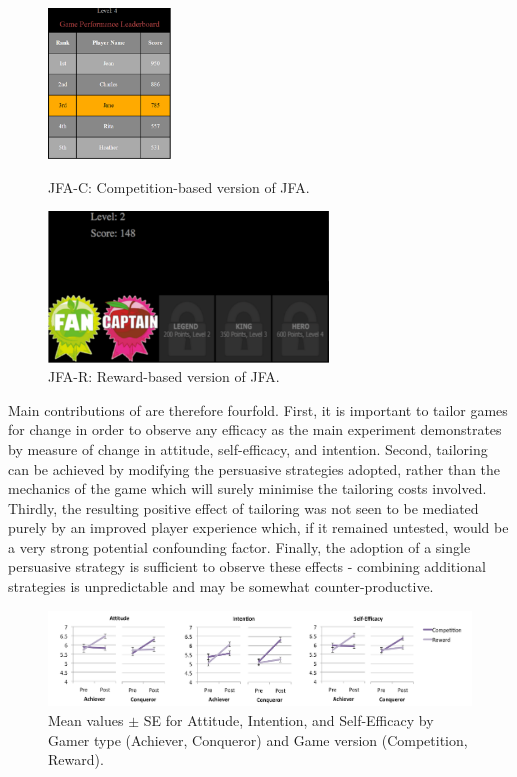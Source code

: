\documentclass[11pt]{article}
\begin{document}
\begin{figure}[H]
\centering
  \includegraphics[height=4cm]{img/orji2017-junk-food-aliens-competition.png}
  \caption{JFA-C: Competition-based version of JFA.}\label{fig:orji2017-junk-food-aliens-competition}
\endminipage\hfill
{}%
\centering
  \includegraphics[height=4cm]{img/orji2017-junk-food-aliens-reward.png}
  \caption{JFA-R: Reward-based version of JFA.}\label{fig:orji2017-junk-food-aliens-reward}
\endminipage
\end{figure}

Main contributions of \citet{orji2017} are therefore fourfold. First, it is important to tailor games for change in order to observe any efficacy as the main experiment demonstrates by measure of change in attitude, self-efficacy, and intention. Second, tailoring can be achieved by modifying the persuasive strategies adopted, rather than the mechanics of the game which will surely minimise the tailoring costs involved. 
Thirdly, the resulting positive effect of tailoring was not seen to be mediated purely by an improved player experience which, if it remained untested, would be a very strong potential confounding factor. Finally, the adoption of a single persuasive strategy is sufficient to observe these effects - combining additional strategies is unpredictable and may be somewhat counter-productive.


\begin{figure}[H]
\centering
\includegraphics[width=\textwidth]{img/orji2017-tailoring-results.png} 
\caption{Mean values $\pm$ SE for Attitude, Intention, and Self-Efficacy by Gamer type (Achiever, Conqueror) and Game version (Competition, Reward).}\label{fig:orji2017-tailoring-results}
\end{figure}
\end{document}
